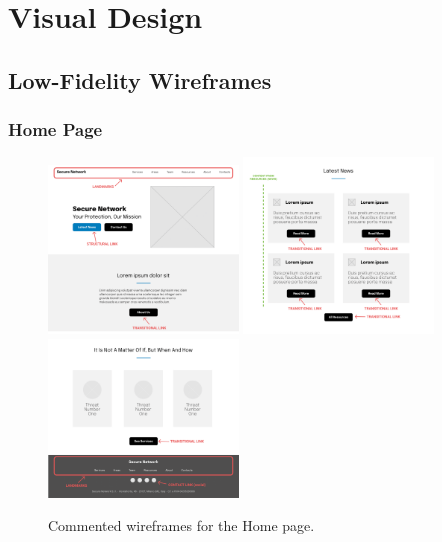 \documentclass[12pt]{report}
\begin{document}
\chapter{Visual Design}

\section{Low-Fidelity Wireframes}

\subsection{Home Page}

\begin{figure}[H]
	\centering
	\includegraphics[width=0.45\textwidth]{low_fid_wireframes/home/1.png}
	\includegraphics[width=0.45\textwidth]{low_fid_wireframes/home/2.png}
	\includegraphics[width=0.45\textwidth]{low_fid_wireframes/home/3.png}
	\caption{Commented wireframes for the Home page.}
\end{figure}
\end{document}
